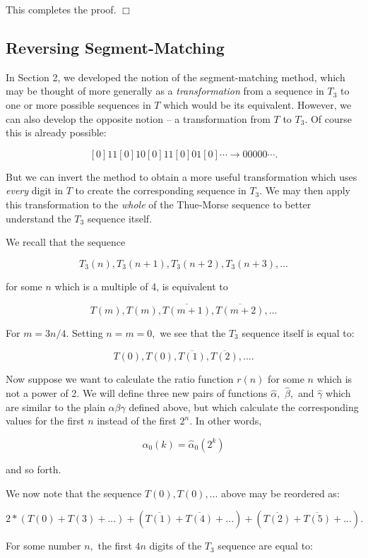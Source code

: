 \documentclass{article}
\begin{document}
This completes the proof. $\Box$

\subsection{Reversing Segment-Matching}

In Section 2, we developed the notion of the segment-matching method, which may be thought of more generally as a \emph{transformation} from a sequence in $T_3$ to one or more possible sequences in $T$ which would be its equivalent. However, we can also develop the opposite notion -- a transformation from $T$ to $T_3.$ Of course this is already possible:

$$[0]11[0]10[0]11[0]01[0] \cdots \rightarrow 00000 \cdots .$$

But we can invert the method to obtain a more useful transformation which uses \emph{every} digit in $T$ to create the corresponding sequence in $T_3.$ We may then apply this transformation to the \emph{whole} of the Thue-Morse sequence to better understand the $T_3$ sequence itself.

We recall that the sequence

$$T_3(n), T_3(n+1), T_3(n+2), T_3(n+3), ...$$

for some $n$ which is a multiple of 4, is equivalent to

$$T(m), T(m), \overline{T(m+1)}, \overline{T(m+2)}, ...$$

For $m = 3n/4.$ Setting $n = m = 0,$ we see that the $T_3$ sequence itself is equal to:

$$T(0), T(0), \overline{T(1)}, \overline{T(2)}, ... .$$

Now suppose we want to calculate the ratio function $r(n)$ for some $n$ which is not a power of 2. We will define three new pairs of functions $\hat{\alpha},$ $\hat{\beta},$ and $\hat{\gamma}$ which are similar to the plain $\alpha \beta \gamma$ defined above, but which calculate the corresponding values for the first $n$ instead of the first $2^n.$ In other words,

$$\alpha_0(k) = \hat{\alpha}_0(2^k)$$

and so forth.

We now note that the sequence $T(0), T(0), ...$ above may be reordered as:

$$2 * (T(0) + T(3) + ...) + (\overline{T(1)} + \overline{T(4)} + ...) + (\overline{T(2)} + \overline{T(5)} + ...) .$$

For some number $n,$ the first $4n$ digits of the $T_3$ sequence are equal to:
\end{document}
